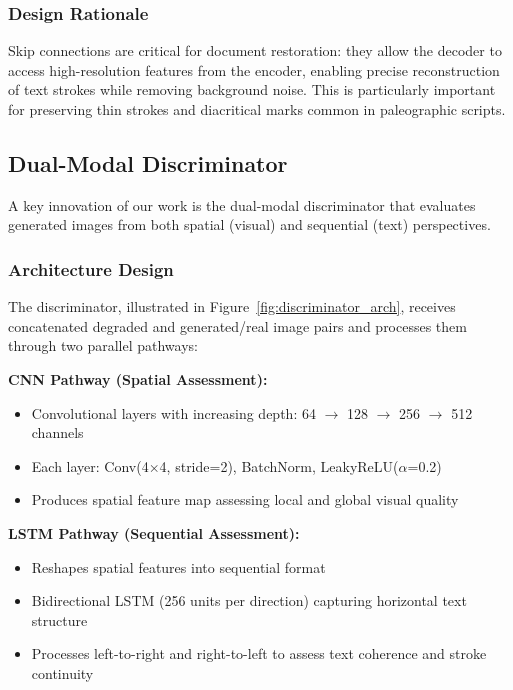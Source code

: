 \documentclass[journal]{IEEEtran}
\begin{document}
\subsubsection{Design Rationale}

Skip connections are critical for document restoration: they allow the decoder to access high-resolution features from the encoder, enabling precise reconstruction of text strokes while removing background noise. This is particularly important for preserving thin strokes and diacritical marks common in paleographic scripts.

\subsection{Dual-Modal Discriminator}

A key innovation of our work is the dual-modal discriminator that evaluates generated images from both spatial (visual) and sequential (text) perspectives.

\subsubsection{Architecture Design}

The discriminator, illustrated in Figure~\ref{fig:discriminator_arch}, receives concatenated degraded and generated/real image pairs and processes them through two parallel pathways:

\textbf{CNN Pathway (Spatial Assessment):}
\begin{itemize}
    \item Convolutional layers with increasing depth: 64 $\rightarrow$ 128 $\rightarrow$ 256 $\rightarrow$ 512 channels
    \item Each layer: Conv(4$\times$4, stride=2), BatchNorm, LeakyReLU($\alpha$=0.2)
    \item Produces spatial feature map assessing local and global visual quality
\end{itemize}

\textbf{LSTM Pathway (Sequential Assessment):}
\begin{itemize}
    \item Reshapes spatial features into sequential format
    \item Bidirectional LSTM (256 units per direction) capturing horizontal text structure
    \item Processes left-to-right and right-to-left to assess text coherence and stroke continuity
\end{itemize}
\end{document}
